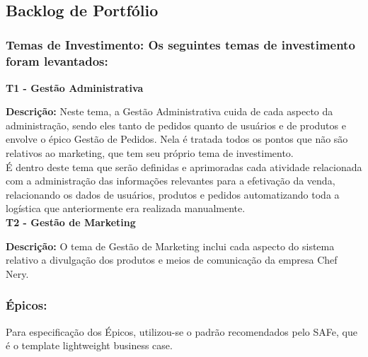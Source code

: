\tab \\ \\ \\

\subsection{Backlog de Portfólio}

\subsubsection{Temas de Investimento: Os seguintes temas de investimento foram levantados:}

\textbf{T1 - Gestão Administrativa}

\textbf{Descrição:} Neste tema, a Gestão Administrativa cuida de cada aspecto da administração, sendo eles tanto de pedidos quanto de usuários e de produtos e envolve o épico Gestão de Pedidos. Nela é tratada todos os pontos que não são relativos ao marketing, que tem seu próprio tema de investimento. \\
\tab É dentro deste tema que serão definidas e aprimoradas cada atividade relacionada com a administração das informações relevantes para a efetivação da venda, relacionando os dados de usuários, produtos e pedidos automatizando toda a logística que anteriormente era realizada manualmente.\\

\textbf{T2 - Gestão de Marketing}

\textbf{Descrição:} O tema de Gestão de Marketing inclui cada aspecto do sistema relativo a divulgação dos produtos e meios de comunicação da empresa Chef Nery. \\

\subsubsection{\textbf{Épicos:}}
Para especificação dos Épicos, utilizou-se o padrão recomendados pelo SAFe, que é o template lightweight business case.\\

\tab \\ \\ \\

